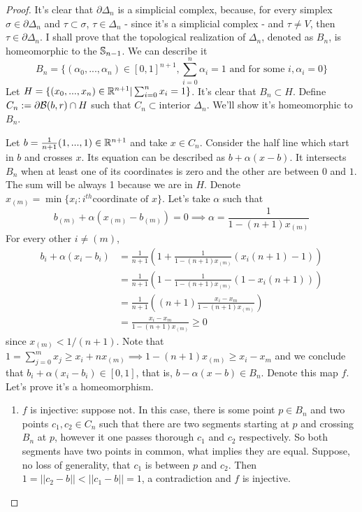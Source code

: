 \begin{proof}

It's clear that $\partial \Delta_n$ is a simplicial complex, because, for
every simplex $\sigma \in \partial \Delta_n$ and $\tau \subset \sigma$, $\tau
\in \Delta_n$ - since it's a simplicial complex - and $\tau \neq V$, then $\tau
\in \partial \Delta_n$. I shall prove that the topological realization of
$\Delta_n$, denoted as $B_n$, is homeomorphic to the $\mathbb{S}_{n-1}$. We can
describe it
$$
B_n = \{(\alpha_0, ..., \alpha_n) \in [0,1]^{n+1}, \sum_{i=0}^n \alpha_i = 1 \text{ and for some } i, \alpha_i = 0\}
$$
Let $H = \{(x_0, ..., x_n) \in \mathbb{R}^{n+1} | \sum_{i=0}^n x_i = 1\}$. It's clear
that $B_n \subset H$. Define $C_n := \partial \mathcal{B}(b,r) \cap H$ such that $C_n
\subset \text{interior } \Delta_n$. We'll show it's homeomorphic
to $B_n$. 

Let $b = \frac{1}{n+1}(1,...,1) \in \mathbb{R}^{n+1}$ and take $x \in C_n$. Consider
the half line which start in $b$ and crosses $x$. Its equation can be
described as $b + \alpha(x - b)$. It intersects $B_n$ when at least one of its
coordinates is zero and the other are between $0$ and $1$. The sum will be
always 1 because we are in $H$. Denote $x_{(m)} = \min\{x_i : i^{th}
\text{coordinate of } x\}$. Let's take $\alpha$ such that 
$$
b_{(m)} + \alpha(x_{(m)} - b_{(m)}) = 0 \implies \alpha = \frac{1}{1 - (n+1)x_{(m)}}
$$
For every other $i \neq (m)$, 
\begin{equation*}
    \begin{split}
        b_i + \alpha(x_i - b_i) &= \frac{1}{n+1}\left(1 + \frac{1}{1 - (n+1)x_{(m)}}(x_i(n+1) - 1)\right) \\
        &= \frac{1}{n+1}\left(1 - \frac{1}{1 - (n+1)x_{(m)}}(1 - x_i(n+1))\right) \\
        &= \frac{1}{n+1}\left((n+1)\frac{x_i - x_{m}}{1 - (n+1)x_{(m)}}\right) \\
        &= \frac{x_i - x_{m}}{1 - (n+1)x_{(m)}} \ge 0
    \end{split}
\end{equation*}
since $x_{(m)} < 1/(n+1)$. Note that $1 = \sum_{j=0}^m x_j \ge x_i + nx_{(m)}
\implies 1 - (n+1)x_{(m)} \ge x_i - x_m$ and we conclude that $b_i +
\alpha(x_i - b_i) \in [0,1]$, that is, $b - \alpha(x - b) \in B_n$. Denote
this map $f$. Let's prove it's a homeomorphism. 

\begin{enumerate}
    \item $f$ is injective: suppose not. In this case, there is some point $p
    \in B_n$ and two points $c_1, c_2 \in C_n$ such that there are two
    segments starting at $p$ and crossing $B_n$ at $p$, however it one passes
    thorough $c_1$ and $c_2$ respectively. So both segments have two points in
    common, what implies they are equal. Suppose, no loss of generality, that
    $c_1$ is between $p$ and $c_2$. Then $1 = ||c_2 - b|| < ||c_1 - b|| = 1$,
    a contradiction and $f$ is injective. 


\end{enumerate}
\end{proof}
